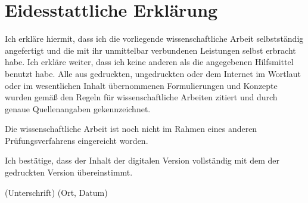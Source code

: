 \chapter*{Eidesstattliche Erklärung}
Ich erkläre hiermit, dass ich die vorliegende wissenschaftliche Arbeit selbstständig angefertigt und die mit ihr unmittelbar verbundenen Leistungen selbst erbracht habe. Ich erkläre weiter, dass ich keine anderen als die angegebenen Hilfsmittel benutzt habe. Alle aus gedruckten, ungedruckten oder dem Internet im Wortlaut oder im wesentlichen Inhalt übernommenen Formulierungen und Konzepte wurden gemäß den Regeln für wissenschaftliche Arbeiten zitiert und durch genaue Quellenangaben gekennzeichnet.
\par 
Die wissenschaftliche Arbeit ist noch nicht im Rahmen eines anderen Prüfungsverfahrens eingereicht
worden.
\par 
Ich bestätige, dass der Inhalt der digitalen Version vollständig mit dem der gedruckten Version übereinstimmt. \par
\vspace{3cm}
(Unterschrift) (Ort, Datum) 

\thispagestyle{empty}